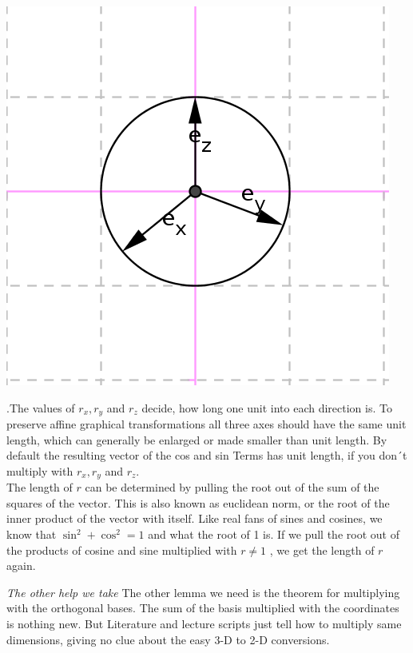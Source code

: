\documentclass{article}
\begin{document}
\begin{center}
\includegraphics[scale=1]{unitvectors.png}
\end{center}

.The values of $r_x, r_y$ and $r_z$ decide, how long one unit into each
direction is. To preserve affine graphical transformations all three
axes should have the same unit length, which can generally be enlarged
or made smaller than unit length. By default the resulting vector of the cos 
and sin Terms has unit length, if you don´t multiply with $r_x, r_y$ and $r_z$. \\

 The length of $r$ can be determined by pulling the root out of the sum of the squares of the vector.
This is also known as euclidean norm, or the root of the inner product of the vector with itself.
Like real fans of sines and cosines, we know that $\sin^2 + \cos^2 = 1$ and what the root of 1 is.
If we pull the root out of the products of cosine and sine multiplied with $r \ne 1$ , we get the length of $r$ again.

\emph{The other help we take} The other lemma we need is the theorem for 
multiplying with the orthogonal bases.
The sum of the basis multiplied with the coordinates is nothing
new. But Literature and lecture scripts just tell how to multiply
same dimensions, giving no clue about the easy 3-D to 2-D conversions.
\end{document}
